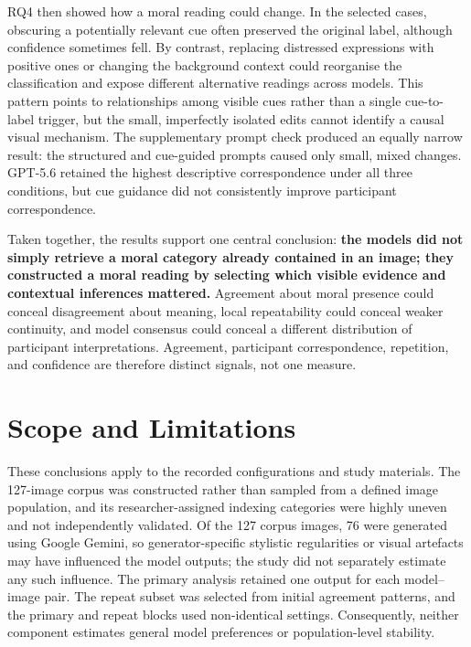 RQ4 then showed how a moral reading could change. In the selected cases,
obscuring a potentially relevant cue often preserved the original label,
although confidence sometimes fell. By contrast, replacing distressed expressions with positive ones or changing
the background context could reorganise the classification and expose
different alternative readings across models. This
pattern points to relationships among visible cues rather than a single
cue-to-label trigger, but the small, imperfectly isolated edits cannot identify
a causal visual mechanism. The supplementary prompt check produced an equally
narrow result: the structured and cue-guided prompts caused only small, mixed
changes. GPT-5.6 retained the highest descriptive correspondence under all
three conditions, but cue guidance did not consistently improve participant
correspondence.

Taken together, the results support one central conclusion: \textbf{the models
did not simply retrieve a moral category already contained in an image; they
constructed a moral reading by selecting which visible evidence and contextual
inferences mattered.} Agreement about moral presence could conceal disagreement
about meaning, local repeatability could conceal weaker continuity, and model
consensus could conceal a different distribution of participant
interpretations. Agreement, participant correspondence, repetition, and
confidence are therefore distinct signals, not one measure.

\section{Scope and Limitations}

These conclusions apply to the recorded configurations and study materials.
The 127-image corpus was constructed rather than sampled from a defined image
population, and its researcher-assigned indexing categories were highly uneven
and not independently validated. Of the 127 corpus images, 76 were generated
using Google Gemini, so generator-specific stylistic regularities or visual
artefacts may have influenced the model outputs; the study did not separately
estimate any such influence. The primary analysis retained one output for
each model--image pair. The repeat subset was selected from initial agreement
patterns, and the primary and repeat blocks used non-identical settings.
Consequently, neither component estimates general model preferences or
population-level stability.

